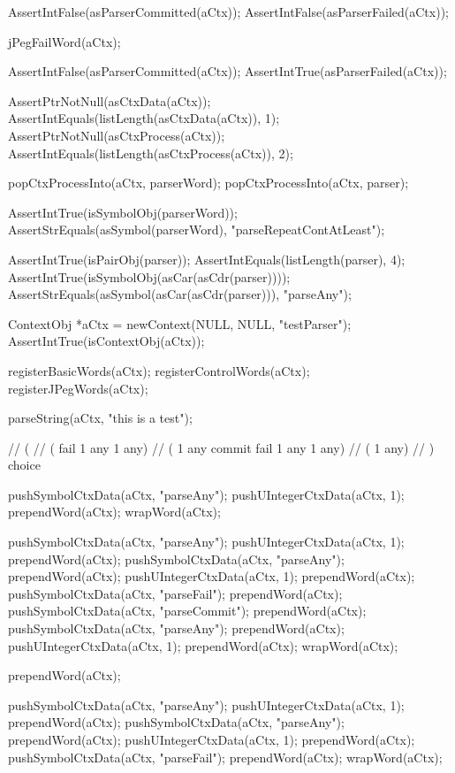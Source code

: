   AssertIntFalse(asParserCommitted(aCtx));
  AssertIntFalse(asParserFailed(aCtx));
  
  jPegFailWord(aCtx);
  
  AssertIntFalse(asParserCommitted(aCtx));
  AssertIntTrue(asParserFailed(aCtx));
  
  AssertPtrNotNull(asCtxData(aCtx));
  AssertIntEquals(listLength(asCtxData(aCtx)), 1);
  AssertPtrNotNull(asCtxProcess(aCtx));
  AssertIntEquals(listLength(asCtxProcess(aCtx)), 2);
  
  popCtxProcessInto(aCtx, parserWord);
  popCtxProcessInto(aCtx, parser);
  
  AssertIntTrue(isSymbolObj(parserWord));
  AssertStrEquals(asSymbol(parserWord), "parseRepeatContAtLeast");
  
  AssertIntTrue(isPairObj(parser));
  AssertIntEquals(listLength(parser), 4);
  AssertIntTrue(isSymbolObj(asCar(asCdr(parser))));
  AssertStrEquals(asSymbol(asCar(asCdr(parser))), "parseAny");
\stopCTest
\stopTestCase


\startCTest
  ContextObj *aCtx = newContext(NULL, NULL, "testParser");
  AssertIntTrue(isContextObj(aCtx));
  
  registerBasicWords(aCtx);
  registerControlWords(aCtx);
  registerJPegWords(aCtx);

  parseString(aCtx, "this is a test");
  
  // (
  //   ( fail 1 any 1 any)
  //   ( 1 any commit fail 1 any 1 any)
  //   ( 1 any)
  // ) choice

  pushSymbolCtxData(aCtx, "parseAny");
  pushUIntegerCtxData(aCtx, 1);
  prependWord(aCtx);
  wrapWord(aCtx);
  
  pushSymbolCtxData(aCtx, "parseAny");
  pushUIntegerCtxData(aCtx, 1);
  prependWord(aCtx);
  pushSymbolCtxData(aCtx, "parseAny");
  prependWord(aCtx);
  pushUIntegerCtxData(aCtx, 1);
  prependWord(aCtx);
  pushSymbolCtxData(aCtx, "parseFail");
  prependWord(aCtx);
  pushSymbolCtxData(aCtx, "parseCommit");
  prependWord(aCtx);
  pushSymbolCtxData(aCtx, "parseAny");
  prependWord(aCtx);
  pushUIntegerCtxData(aCtx, 1);
  prependWord(aCtx);
  wrapWord(aCtx);
  
  prependWord(aCtx);
  
  pushSymbolCtxData(aCtx, "parseAny");
  pushUIntegerCtxData(aCtx, 1);
  prependWord(aCtx);
  pushSymbolCtxData(aCtx, "parseAny");
  prependWord(aCtx);
  pushUIntegerCtxData(aCtx, 1);
  prependWord(aCtx);
  pushSymbolCtxData(aCtx, "parseFail");
  prependWord(aCtx);
  wrapWord(aCtx);
  
